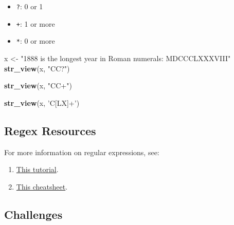 \documentclass[
]{book}
\newenvironment{Shaded}{\begin{snugshade}}{\end{snugshade}}
\newcommand{\KeywordTok}[1]{\textcolor[rgb]{0.13,0.29,0.53}{\textbf{#1}}}
\newcommand{\NormalTok}[1]{#1}
\newcommand{\StringTok}[1]{\textcolor[rgb]{0.31,0.60,0.02}{#1}}
\providecommand{\tightlist}{%
  \setlength{\itemsep}{0pt}\setlength{\parskip}{0pt}}
\begin{document}
\begin{itemize}
\tightlist
\item
  \texttt{?}: 0 or 1
\item
  \texttt{+}: 1 or more
\item
  \texttt{*}: 0 or more
\end{itemize}

\begin{Shaded}
\begin{Highlighting}[]
\NormalTok{x <-}\StringTok{ "1888 is the longest year in Roman numerals: MDCCCLXXXVIII"}
\KeywordTok{str_view}\NormalTok{(x, }\StringTok{"CC?"}\NormalTok{)}
\end{Highlighting}
\end{Shaded}

\hypertarget{htmlwidget-416566eb193bf50d04e6}{}

\begin{Shaded}
\begin{Highlighting}[]
\KeywordTok{str_view}\NormalTok{(x, }\StringTok{"CC+"}\NormalTok{)}
\end{Highlighting}
\end{Shaded}

\hypertarget{htmlwidget-72cbf064100ce560a04c}{}

\begin{Shaded}
\begin{Highlighting}[]
\KeywordTok{str_view}\NormalTok{(x, }\StringTok{'C[LX]+'}\NormalTok{)}
\end{Highlighting}
\end{Shaded}

\hypertarget{htmlwidget-d11fc4360aa0230696d7}{}

\hypertarget{regex-resources}{%
\subsection{Regex Resources}\label{regex-resources}}

For more information on regular expressions, see:

\begin{enumerate}
\def\labelenumi{\arabic{enumi}.}
\tightlist
\item
  \href{http://regextutorials.com/}{This tutorial}.
\item
  \href{https://medium.com/factory-mind/regex-tutorial-a-simple-cheatsheet-by-examples-649dc1c3f285}{This cheatsheet}.
\end{enumerate}

\hypertarget{challenges-15}{%
\subsection{Challenges}\label{challenges-15}}
\end{document}
